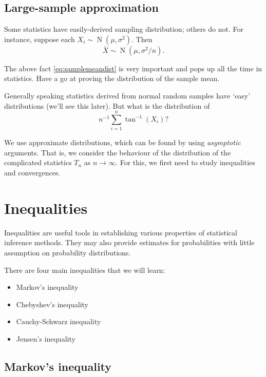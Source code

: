 \documentclass[
]{book}
\providecommand{\tightlist}{%
  \setlength{\itemsep}{0pt}\setlength{\parskip}{0pt}}
\DeclareMathOperator{\N}{N}
\theoremstyle{definition}
\theoremstyle{definition}
\theoremstyle{definition}
\theoremstyle{definition}
\theoremstyle{remark}
\begin{document}
\hypertarget{large-sample-approximation}{%
\subsection{Large-sample approximation}\label{large-sample-approximation}}

Some statistics have easily-derived sampling distribution; others do not.
For instance, suppose each \(X_i\sim\N(\mu,\sigma^2)\). Then
\begin{equation}
\bar X \sim \N(\mu, \sigma^2/n). \label{eq:samplemeandist}
\end{equation}

The above fact \eqref{eq:samplemeandist} is very important and pops up all the time in statistics. Have a go at proving the distribution of the sample mean.

Generally speaking statistics derived from normal random samples have `easy' distributions (we'll see this later).
But what is the distribution of
\[
n^{-1}\sum_{i=1}^n \tan^{-1}(X_i)?
\]

We use approximate distributions, which can be found by using \emph{asymptotic} arguments.
That is, we consider the behaviour of the distribution of the complicated statistics \(T_n\) as \(n\to\infty\).
For this, we first need to study inequalities and convergences.

\hypertarget{inequalities}{%
\section{Inequalities}\label{inequalities}}

Inequalities are useful tools in establishing various properties of statistical inference methods.
They may also provide estimates for probabilities with little assumption on probability distributions.

There are four main inequalities that we will learn:

\begin{itemize}
\tightlist
\item
  Markov's inequality
\item
  Chebyshev's inequality
\item
  Cauchy-Schwarz inequality
\item
  Jensen's inequality
\end{itemize}

\hypertarget{markovs-inequality}{%
\subsection{Markov's inequality}\label{markovs-inequality}}
\end{document}
